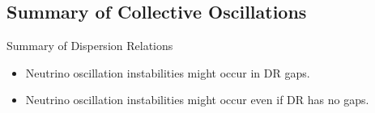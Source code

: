 










\subsection{Summary of Collective Oscillations}

\begin{frame}{Summary of Dispersion Relations}

\begin{itemize}
   \item Neutrino oscillation instabilities might occur in DR gaps.
   \item Neutrino oscillation instabilities might occur even if DR has no gaps.
\end{itemize}

\end{frame}
